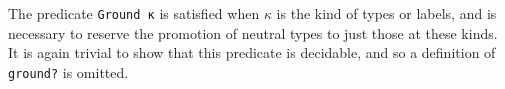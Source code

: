 \documentclass[authoryear, acmsmall, screen, review, nonacm]{acmart} %
\begin{document}
The predicate \verb!Ground κ! is satisfied when $\kappa$ is the kind of types or labels, and is necessary to reserve the promotion of neutral types to just those at these kinds. It is again trivial to show that this predicate is decidable, and so a definition of \verb!ground?! is omitted.

\begin{code}%
\>[0]\AgdaSpace{}%
\AgdaSymbol{:}\AgdaSpace{}%
\AgdaSpace{}%
\AgdaSpace{}%
\<%
\\
\>[0]\AgdaSpace{}%
\AgdaSymbol{:}\AgdaSpace{}%
\AgdaSpace{}%
\AgdaSpace{}%
\AgdaSpace{}%
\AgdaSpace{}%
\AgdaSymbol{(}\AgdaSpace{}%
\AgdaSymbol{)}\<%
\\
\>[0]\AgdaSpace{}%
\AgdaSpace{}%
\AgdaSymbol{=}\AgdaSpace{}%
\<%
\\
\>[0]\AgdaSpace{}%
\AgdaSpace{}%
\AgdaSymbol{=}\AgdaSpace{}%
\<%
\\
\>[0]\AgdaSpace{}%
\AgdaSymbol{(}\AgdaSpace{}%
\AgdaSpace{}%
\AgdaSymbol{)}\AgdaSpace{}%
\AgdaSymbol{=}\AgdaSpace{}%
\<%
\\
\>[0]\AgdaSpace{}%
\AgdaOperator{\AgdaInductiveConstructor{R[}}\AgdaSpace{}%
\AgdaSpace{}%
\AgdaOperator{\AgdaInductiveConstructor{]}}\AgdaSpace{}%
\AgdaSymbol{=}\AgdaSpace{}%
\<%
\end{code}
\begin{code}[hide]%
\>[0]\AgdaSpace{}%
\AgdaSpace{}%
\AgdaSymbol{=}\AgdaSpace{}%
\AgdaSpace{}%
\<%
\\
\>[0]\AgdaSpace{}%
\AgdaSpace{}%
\AgdaSymbol{=}\AgdaSpace{}%
\AgdaSpace{}%
\<%
\\
\>[0]\AgdaSpace{}%
\AgdaSymbol{(\AgdaUnderscore{}}\AgdaSpace{}%
\AgdaSpace{}%
\AgdaSymbol{\AgdaUnderscore{})}\AgdaSpace{}%
\AgdaSymbol{=}\AgdaSpace{}%
\AgdaSpace{}%
\AgdaSpace{}%
\AgdaSymbol{())}\<%
\\
\>[0]\AgdaSpace{}%
\AgdaOperator{\AgdaInductiveConstructor{R[}}\AgdaSpace{}%
\AgdaSymbol{\AgdaUnderscore{}}\AgdaSpace{}%
\AgdaOperator{\AgdaInductiveConstructor{]}}\AgdaSpace{}%
\AgdaSymbol{=}\AgdaSpace{}%
\AgdaSpace{}%
\AgdaSpace{}%
\AgdaSymbol{())}\<%
\end{code}
\end{document}
